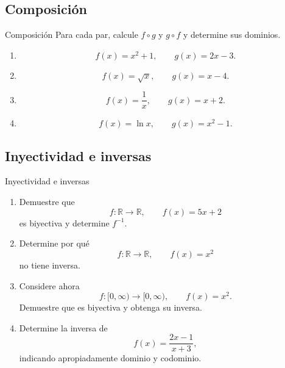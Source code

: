 \documentclass[aspectratio=169,10pt]{beamer}
\newcommand{\R}{\mathbb{R}}
\begin{document}
\subsection*{Composición}
\begin{frame}{Composición}
Para cada par, calcule $f\circ g$ y $g\circ f$ y determine sus dominios.

\begin{enumerate}
    \item
    \[
    f(x)=x^2+1,\qquad g(x)=2x-3.
    \]
    \item
    \[
    f(x)=\sqrt{x},\qquad g(x)=x-4.
    \]
    \item
    \[
    f(x)=\frac1x,\qquad g(x)=x+2.
    \]
    \item
    \[
    f(x)=\ln x,\qquad g(x)=x^2-1.
    \]
\end{enumerate}
\end{frame}
\subsection*{Inyectividad e inversas}
\begin{frame}{Inyectividad e inversas}
\begin{enumerate}
    \item Demuestre que
    \[
    f:\R\to\R,\qquad f(x)=5x+2
    \]
    es biyectiva y determine $f^{-1}$.

    \item Determine por qué
    \[
    f:\R\to\R,\qquad f(x)=x^2
    \]
    no tiene inversa.

    \item Considere ahora
    \[
    f:[0,\infty)\to[0,\infty),\qquad f(x)=x^2.
    \]
    Demuestre que es biyectiva y obtenga su inversa.

    \item Determine la inversa de
    \[
    f(x)=\frac{2x-1}{x+3},
    \]
    indicando apropiadamente dominio y codominio.
\end{enumerate}
\end{frame}
\end{document}
